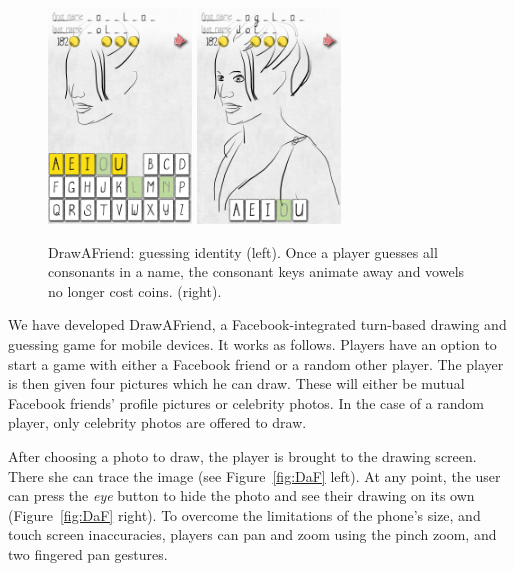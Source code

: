 \begin{figure}
  \centering%
\includegraphics[width=1.5in]{DaF/angelina_guess1.png}
\hspace{0.1in}
\includegraphics[width=1.5in]{DaF/angelina_guess2.png}
  \caption{DrawAFriend: guessing identity (left). Once a player guesses all consonants in a name, the consonant keys animate away and vowels no longer cost coins. (right).}
  \label{fig:DaF2}
\end{figure}

We have developed DrawAFriend, a Facebook-integrated turn-based drawing and guessing game for mobile devices.  It works as follows. Players have an option to start a game with either a Facebook friend or a random other player.  The player is then given four pictures which he can draw. These will either be mutual Facebook friends' profile pictures or  celebrity photos. In the case of a random player, only celebrity photos are offered to draw.

After choosing a photo to draw, the player is brought to the drawing screen. There she can trace the image (see Figure~\ref{fig:DaF} left). At any point, the user can press the {\em eye} button to hide the photo and see their drawing on its own (Figure~\ref{fig:DaF} right). To overcome the limitations of the phone's size, and touch screen inaccuracies, players can pan and zoom using the pinch zoom, and two fingered pan gestures.

